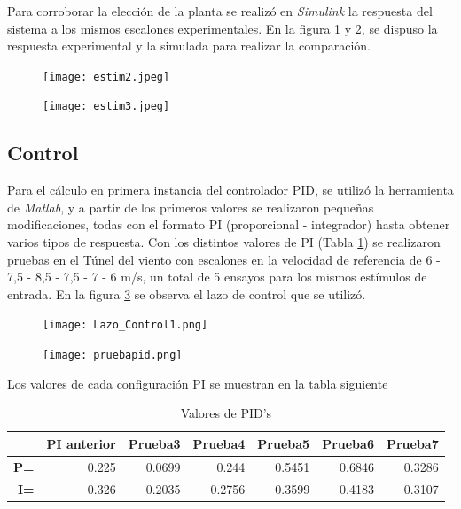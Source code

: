     Para corroborar la elección de la planta se realizó en \textit{Simulink} la respuesta del sistema a los mismos escalones experimentales. En la figura \ref{fig:estim2} y \ref{fig:estim3}, se dispuso la respuesta experimental y la simulada para realizar la comparación.
    
    \begin{figure}[H]
    	\centering
    	\texttt{[image: estim2.jpeg]}
    	\label{fig:estim2}
    \end{figure}

\begin{figure}[H]
	\centering
	\texttt{[image: estim3.jpeg]}
	\label{fig:estim3}
\end{figure}
       
    \subsection{Control}
    Para el cálculo en primera instancia del controlador PID, se utilizó la herramienta de \textit{Matlab}, y a partir de los primeros valores se realizaron pequeñas modificaciones, todas con el formato PI (proporcional - integrador) hasta obtener varios tipos de respuesta.
    Con los distintos valores de PI (Tabla \ref{tab:pid}) se realizaron pruebas en el Túnel del viento con escalones en la velocidad de referencia de 6 - 7,5 - 8,5 - 7,5 - 7 - 6 m/s,  un total de 5 ensayos para los mismos estímulos de entrada. En la figura \ref{fig:Lazo_Control} se observa el lazo de control que se utilizó. 
   
    \begin{figure}[H]
   	\centering
   	\texttt{[image: Lazo\_Control1.png]}
   	\label{fig:Lazo_Control}
   \end{figure}
    \begin{figure}[H]
    	\centering
    	\texttt{[image: pruebapid.png]}
    	\label{fig:PI3}
    \end{figure}
    
    Los valores de cada configuración PI se muestran en la tabla siguiente
    \begin{table}[H]
    	\centering
    	\begin{tabular}{r|r|r|r|r|r|r|}
    		\cline{2-7}
    		\multicolumn{1}{l|}{} & \multicolumn{1}{c|}{\textbf{PI anterior}} & \multicolumn{1}{c|}{\textbf{Prueba3}} & \multicolumn{1}{c|}{\textbf{Prueba4}} & \multicolumn{1}{c|}{\textbf{Prueba5}} & \multicolumn{1}{c|}{\textbf{Prueba6}} & \multicolumn{1}{c|}{\textbf{Prueba7}} \\ \hline
    		\multicolumn{1}{|r|}{\textbf{P=}} & 0.225 & 0.0699 & 0.244 & 0.5451 & 0.6846 & 0.3286 \\ \hline
    		\multicolumn{1}{|r|}{\textbf{I=}} & 0.326 & 0.2035 & 0.2756 & 0.3599 & 0.4183 & 0.3107 \\ \hline
    	\end{tabular}
    \caption{Valores de PID's}
    \label{tab:pid}
    \end{table}
    
